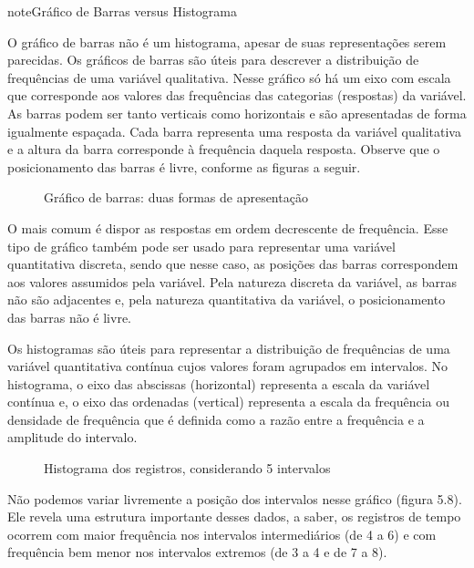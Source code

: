 \begin{observation}{note}{Gráfico de Barras versus Histograma}

O gráfico de barras não é um histograma, apesar de suas representações serem parecidas.  Os gráficos de barras são úteis para descrever a distribuição de frequências de uma variável qualitativa. Nesse gráfico só há um eixo com escala que corresponde aos valores das frequências das categorias (respostas) da variável. As barras podem ser tanto verticais como horizontais e são apresentadas de forma igualmente espaçada. Cada barra representa uma resposta da variável qualitativa e a altura da barra corresponde à frequência daquela resposta. Observe que o posicionamento das barras é livre, conforme as figuras a seguir.

\begin{figure}[H]
\centering
\capstart

\noindent{}
\caption{Gráfico de barras: duas formas de apresentação}\label{\detokenize{PE103-4:id2}}\label{\detokenize{PE103-4:id10}}\end{figure}

O mais comum é dispor as respostas em ordem decrescente de frequência. Esse tipo de gráfico também pode ser usado para representar uma variável quantitativa discreta, sendo que nesse caso, as posições das barras correspondem aos valores assumidos pela variável. Pela natureza discreta da variável, as barras não são adjacentes e, pela natureza quantitativa da variável, o posicionamento das barras não é livre.

Os histogramas são úteis para representar a distribuição de frequências de uma variável quantitativa contínua cujos valores foram agrupados em intervalos. No histograma, o eixo das abscissas (horizontal) representa a escala da variável contínua e, o eixo das ordenadas (vertical) representa a escala da frequência ou densidade de frequência que é definida como a razão entre a frequência e a amplitude do intervalo.

\begin{figure}[H]
\centering
\capstart

\noindent{}
\caption{Histograma dos registros, considerando 5 intervalos}\label{\detokenize{PE103-4:id3}}\label{\detokenize{PE103-4:id11}}\end{figure}

Não podemos variar livremente a posição dos intervalos nesse gráfico (figura 5.8). Ele revela uma estrutura importante desses dados, a saber, os registros de tempo ocorrem com maior frequência nos intervalos intermediários (de 4 a 6) e com frequência bem menor nos intervalos extremos (de 3 a 4 e de 7 a 8).
\end{observation}



